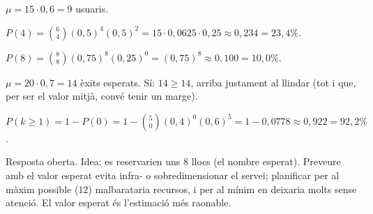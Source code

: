 \begin{solucions}
\begin{sollist}
  \item $\mu=15\cdot 0,6=9$ usuaris.
  \item $P(4)=\binom{6}{4}(0,5)^4(0,5)^2=15\cdot 0,0625\cdot 0,25\approx 0,234=23,4\%$.
  \item $P(8)=\binom{8}{8}(0,75)^8(0,25)^0=(0,75)^8\approx 0,100=10,0\%$.
  \item $\mu=20\cdot 0,7=14$ èxits esperats. Sí: $14\ge 14$, arriba justament al llindar
        (tot i que, per ser el valor mitjà, convé tenir un marge).
  \item $P(k\ge 1)=1-P(0)=1-\binom{5}{0}(0,4)^0(0,6)^5=1-0,0778\approx 0,922=92,2\%$.
  \item Resposta oberta. Idea: es reservarien uns $8$ llocs (el nombre esperat). Preveure
        amb el valor esperat evita infra- o sobredimensionar el servei; planificar per al
        màxim possible ($12$) malbarataria recursos, i per al mínim en deixaria molts
        sense atenció. El valor esperat és l'estimació més raonable.
\end{sollist}
\end{solucions}
